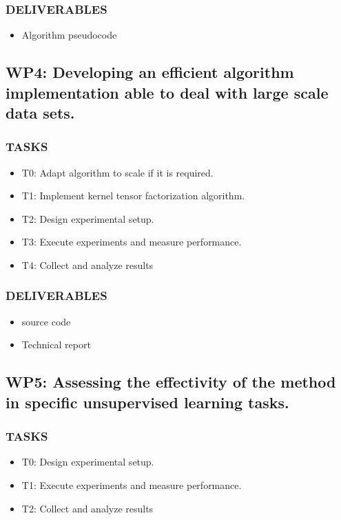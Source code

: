 \documentclass[letterpaper,12pt]{article}
\begin{document}
\subsubsection*{DELIVERABLES}
\begin{itemize}
 \item Algorithm pseudocode
\end{itemize}


\subsection*{WP4: Developing an efficient algorithm implementation able to deal with large scale data sets.}
\subsubsection*{TASKS}
\begin{itemize}
\item T0: Adapt algorithm to scale if it is required.
\item T1: Implement kernel tensor factorization algorithm.
\item T2: Design experimental setup.
\item T3: Execute experiments and measure performance.
\item T4: Collect and analyze results
\end{itemize}
\subsubsection*{DELIVERABLES}
\begin{itemize}
 \item source code
 \item Technical report
\end{itemize}



\subsection*{WP5: Assessing the effectivity of the method in specific unsupervised learning tasks.}
\subsubsection*{TASKS}
\begin{itemize}
\item T0: Design experimental setup.
\item T1: Execute experiments and measure performance.
\item T2: Collect and analyze results
\end{itemize}
\end{document}

